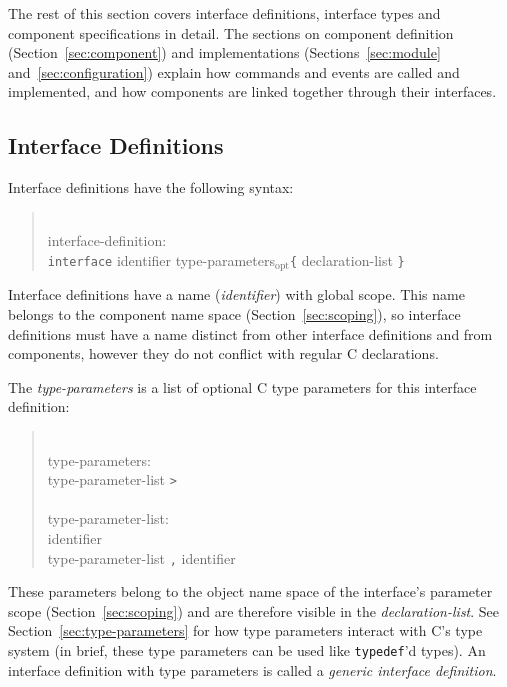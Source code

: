 \documentclass[11pt,letterpaper]{article}
\newcommand{\kw}[1]{{\tt #1}}
\newcommand{\opt}{$_{\mbox{opt}}$\xspace}
\newcommand{\grammarshift}{\vspace*{-.7cm}}
\newcommand{\grammarindent}{\hspace*{2cm}\= \\ \kill}
\begin{document}
The rest of this section covers interface definitions, interface types and
component specifications in detail. The sections on component definition
(Section~\ref{sec:component}) and implementations
(Sections~\ref{sec:module} and~\ref{sec:configuration}) explain how
commands and events are called and implemented, and how components are
linked together through their interfaces.

\subsection{Interface Definitions}

Interface definitions have the following syntax:
\begin{quote} \grammarshift
\em \begin{tabbing}
\grammarindent
interface-definition:\\
\>	\kw{interface} identifier type-parameters\opt\kw{\{} declaration-list \kw{\}}
\end{tabbing}
\end{quote}
Interface definitions have a name (\emph{identifier}) with global
scope. This name belongs to the component name space
(Section~\ref{sec:scoping}), so interface definitions must have a name
distinct from other interface definitions and from components, however they
do not conflict with regular C declarations.

The \emph{type-parameters} is a list of optional C type parameters
for this interface definition:
\begin{quote} \grammarshift
\em \begin{tabbing}
\grammarindent
type-parameters:\\
\>\kw{<} type-parameter-list \kw{>}\\
\\
type-parameter-list:\\
\>identifier\\
\>type-parameter-list \kw{,} identifier
\end{tabbing}
\end{quote}
These parameters belong to the object name space of the interface's
parameter scope (Section~\ref{sec:scoping}) and are therefore visible in
the \emph{declaration-list}. See Section~\ref{sec:type-parameters} for how
type parameters interact with C's type system (in brief, these type
parameters can be used like \kw{typedef}'d types). An interface definition
with type parameters is called a \emph{generic interface definition}.
\end{document}

